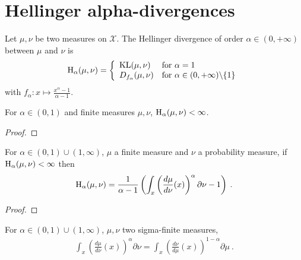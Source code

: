 \chapter{Hellinger alpha-divergences}

\begin{definition}
  \label{def:hellingerAlpha}
  \leanok
  Let $\mu, \nu$ be two measures on $\mathcal X$. The Hellinger divergence of order $\alpha \in (0,+\infty)$ between $\mu$ and $\nu$ is
  \begin{align*}
  \operatorname{H}_\alpha(\mu, \nu) = \left\{
  \begin{array}{ll}
    \operatorname{KL}(\mu, \nu) & \text{for } \alpha = 1
    \\
    D_{f_\alpha}(\mu, \nu) & \text{for } \alpha \in (0,+\infty) \backslash \{1\}
  \end{array}\right.
  \end{align*}
  with $f_\alpha : x \mapsto \frac{x^{\alpha} - 1}{\alpha - 1}$.
\end{definition}

\begin{lemma}
  \label{lem:hellingerAlpha_ne_top_of_le_one}
  \leanok
  For $\alpha \in (0, 1)$ and finite measures $\mu, \nu$, $\operatorname{H}_\alpha(\mu, \nu) < \infty$.
\end{lemma}

\begin{proof}\leanok
\uses{}
\end{proof}

\begin{lemma}
  \label{lem:hellingerAlpha_eq_integral}
  \leanok
  For $\alpha \in (0,1)\cup(1, \infty)$, $\mu$ a finite measure and $\nu$ a probability measure, if $\operatorname{H}_\alpha(\mu, \nu) < \infty$ then
  \begin{align*}
  \operatorname{H}_\alpha(\mu, \nu) = \frac{1}{\alpha - 1} \left( \int_x \left(\frac{d \mu}{d \nu}(x)\right)^\alpha \partial \nu - 1 \right)
  \: .
  \end{align*}
\end{lemma}

\begin{proof}\leanok
\uses{}
\end{proof}

\begin{lemma}
  \label{lem:integral_rpow_rnDeriv}
  \leanok
  \uses{}
  For $\alpha \in (0,1)\cup(1, \infty)$, $\mu, \nu$ two sigma-finite measures,
  \begin{align*}
  \int_x \left(\frac{d \mu}{d \nu}(x)\right)^\alpha \partial \nu
  = \int_x \left(\frac{d \nu}{d \mu}(x)\right)^{1 - \alpha} \partial \mu
  \: .
  \end{align*}
\end{lemma}

